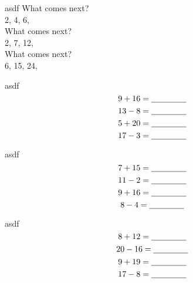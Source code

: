 \documentclass[letter, grid,frame,backs]{flashcards}
\begin{document}
\begin{flashcard}{asdf}
\Huge
\center
\vspace*{-0.8in}
What comes next? \\
\vspace*{-0.3in}
2, 4, 6, \underline{\hspace{1.5cm}} \\
What comes next? \\
\vspace*{-0.3in}
2, 7, 12, \underline{\hspace{1.5cm}} \\
What comes next? \\
\vspace*{-0.3in}
6, 15, 24, \underline{\hspace{1.5cm}} \\

\end{flashcard}
\begin{flashcard}{asdf}
\Huge
\center
\vspace*{-0.8in}
\[
9 + 16 = \underline{\hspace{1.5cm}} 
\]
\[
13 - 8 = \underline{\hspace{1.5cm}}
\]
\[
5 + 20 = \underline{\hspace{1.5cm}} 
\]
\[
17 - 3 = \underline{\hspace{1.5cm}}
\]

\end{flashcard}
\begin{flashcard}{asdf}
\Huge
\center
\vspace*{-0.8in}
\[
7 + 15 = \underline{\hspace{1.5cm}} 
\]
\[
11 - 2 = \underline{\hspace{1.5cm}}
\]
\[
9 + 16 = \underline{\hspace{1.5cm}} 
\]
\[
8 - 4 = \underline{\hspace{1.5cm}}
\]

\end{flashcard}
\begin{flashcard}{asdf}
\Huge
\center
\vspace*{-0.8in}
\[
8 + 12 = \underline{\hspace{1.5cm}} 
\]
\[
20 - 16 = \underline{\hspace{1.5cm}}
\]
\[
9 + 19 = \underline{\hspace{1.5cm}} 
\]
\[
17 - 8 = \underline{\hspace{1.5cm}}
\]

\end{flashcard}
\end{document}
